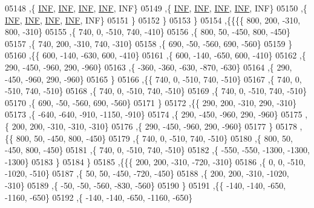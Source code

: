 \begin{DoxyCode}
05148     ,\{   \hyperlink{constants_8h_a12c2040f25d8e3a7b9e1c2024c618cb6}{INF},   \hyperlink{constants_8h_a12c2040f25d8e3a7b9e1c2024c618cb6}{INF},   \hyperlink{constants_8h_a12c2040f25d8e3a7b9e1c2024c618cb6}{INF},   \hyperlink{constants_8h_a12c2040f25d8e3a7b9e1c2024c618cb6}{INF},   INF\}
05149     ,\{   \hyperlink{constants_8h_a12c2040f25d8e3a7b9e1c2024c618cb6}{INF},   \hyperlink{constants_8h_a12c2040f25d8e3a7b9e1c2024c618cb6}{INF},   \hyperlink{constants_8h_a12c2040f25d8e3a7b9e1c2024c618cb6}{INF},   \hyperlink{constants_8h_a12c2040f25d8e3a7b9e1c2024c618cb6}{INF},   INF\}
05150     ,\{   \hyperlink{constants_8h_a12c2040f25d8e3a7b9e1c2024c618cb6}{INF},   \hyperlink{constants_8h_a12c2040f25d8e3a7b9e1c2024c618cb6}{INF},   \hyperlink{constants_8h_a12c2040f25d8e3a7b9e1c2024c618cb6}{INF},   \hyperlink{constants_8h_a12c2040f25d8e3a7b9e1c2024c618cb6}{INF},   INF\}
05151     \}
05152    \}
05153   \}
05154  ,\{\{\{\{   800,   200,  -310,   800,  -310\}
05155     ,\{   740,     0,  -510,   740,  -410\}
05156     ,\{   800,    50,  -450,   800,  -450\}
05157     ,\{   740,   200,  -310,   740,  -310\}
05158     ,\{   690,   -50,  -560,   690,  -560\}
05159     \}
05160    ,\{\{   600,  -140,  -630,   600,  -410\}
05161     ,\{   600,  -140,  -650,   600,  -410\}
05162     ,\{   290,  -450,  -960,   290,  -960\}
05163     ,\{  -360,  -360,  -630,  -870,  -630\}
05164     ,\{   290,  -450,  -960,   290,  -960\}
05165     \}
05166    ,\{\{   740,     0,  -510,   740,  -510\}
05167     ,\{   740,     0,  -510,   740,  -510\}
05168     ,\{   740,     0,  -510,   740,  -510\}
05169     ,\{   740,     0,  -510,   740,  -510\}
05170     ,\{   690,   -50,  -560,   690,  -560\}
05171     \}
05172    ,\{\{   290,   200,  -310,   290,  -310\}
05173     ,\{  -640,  -640,  -910, -1150,  -910\}
05174     ,\{   290,  -450,  -960,   290,  -960\}
05175     ,\{   200,   200,  -310,  -310,  -310\}
05176     ,\{   290,  -450,  -960,   290,  -960\}
05177     \}
05178    ,\{\{   800,    50,  -450,   800,  -450\}
05179     ,\{   740,     0,  -510,   740,  -510\}
05180     ,\{   800,    50,  -450,   800,  -450\}
05181     ,\{   740,     0,  -510,   740,  -510\}
05182     ,\{  -550,  -550, -1300, -1300, -1300\}
05183     \}
05184    \}
05185   ,\{\{\{   200,   200,  -310,  -720,  -310\}
05186     ,\{     0,     0,  -510, -1020,  -510\}
05187     ,\{    50,    50,  -450,  -720,  -450\}
05188     ,\{   200,   200,  -310, -1020,  -310\}
05189     ,\{   -50,   -50,  -560,  -830,  -560\}
05190     \}
05191    ,\{\{  -140,  -140,  -650, -1160,  -650\}
05192     ,\{  -140,  -140,  -650, -1160,  -650\}

\end{DoxyCode}
